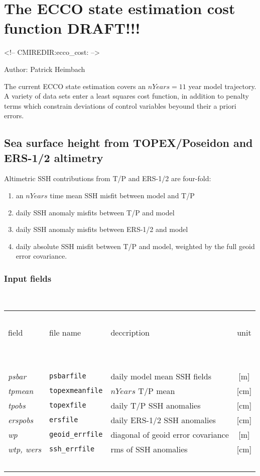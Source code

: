 \section{The ECCO state estimation cost function DRAFT!!!
\label{sectioneccocost}}
\begin{rawhtml}
<!-- CMIREDIR:ecco_cost: -->
\end{rawhtml}

Author: Patrick Heimbach

The current ECCO state estimation covers an $nYears = 11$ year
model trajectory.
A variety of data sets enter a least squares cost function,
in addition to penalty terms which constrain deviations
of control variables beyound their a priori errors.

\subsection{Sea surface height from TOPEX/Poseidon and ERS-1/2 altimetry}

Altimetric SSH contributions from T/P and ERS-1/2 are four-fold:
%
\begin{enumerate}
%
\item 
an $nYears$ time mean SSH misfit between
model and T/P
%
\item
daily SSH anomaly misfits between T/P and model
%
\item
daily SSH anomaly misfits between ERS-1/2 and model
%
\item
daily absolute SSH misfit between T/P and model,
weighted by the full geoid error covariance.
%
\end{enumerate}

\subsubsection{Input fields}
~

\begin{table}[!ht]
\begin{center}
\begin{tabular}{lllc}
\hline \hline
~&~&~&~\\
field & file name & deccription & unit \\
~&~&~&~\\
\hline
~&~&~&~\\
{\it psbar} & {\tt psbarfile} & daily model mean SSH fields & [m] \\
{\it tpmean} & {\tt topexmeanfile} & $nYears$ T/P mean & [cm] \\
{\it tpobs}  & {\tt topexfile} & daily T/P SSH anomalies & [cm] \\
{\it erspobs}  & {\tt ersfile} & daily ERS-1/2 SSH anomalies & [cm] \\
{\it wp} & {\tt geoid\_errfile} & diagonal of geoid error covariance & [m] \\
{\it wtp, wers} & {\tt ssh\_errfile} & rms of SSH anomalies & [cm] \\
~&~&~&~\\
\hline \hline
\end{tabular}
\end{center}
\end{table}


